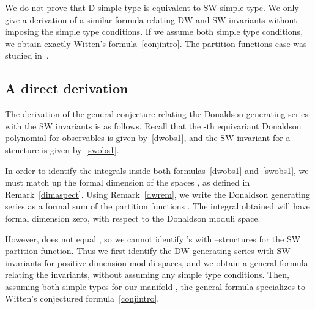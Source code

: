 \documentclass[a4paper,12pt,reqno,sumlimits]{amsart}
\theoremstyle{plain}
\theoremstyle{definition}
\providecommand{\1}{{\bf 1}}
\providecommand{\calA}{{\mathcal A}}
\providecommand{\calG}{{\mathcal G}}
\providecommand{\calO}{{\mathcal O}}
\providecommand{\spinc}{\myHighlight{$\text{spin}^c$}\coordHE{}}
\numberwithin{equation}{section}
\begin{document}
We do not prove that D-simple type is equivalent to SW-simple type. We only
give a derivation of a similar formula relating DW and SW invariants without
imposing the simple type conditions. If we assume both simple type
conditions, we obtain exactly Witten's formula~\eqref{conjintro}.  The
partition functions case was studied in~\cite{vajiac}.


\subsection{A direct derivation}

The derivation of the general conjecture relating the Donaldson generating
series with the SW invariants is as follows.  Recall that the \coordHE{}-th
equivariant Donaldson polynomial for observables \myHighlight{$\calO=\Sigma^a\wedge\nu^b$}\coordHE{}
is given by~\eqref{dwobs1}, and the SW invariant for a \spinc--structure \coordHE{}
is given by~\eqref{swobs1}. 

In order to identify the integrals inside both formulas~\eqref{dwobs1}
and~\eqref{swobs1}, we must match up the formal dimension of the spaces
\myHighlight{$\calA_{l}/\calG_{l}$}\coordHE{}, as defined in Remark~\ref{dimaspect}.  Using
Remark~\ref{dwrem}, we write the Donaldson generating series as a formal sum
of the partition functions \coordHE{}. The integral obtained will have formal
dimension zero, with respect to the Donaldson moduli space.  

However, \coordHE{} does not equal \myHighlight{$2\chi+3\sigma$}\coordHE{}, so we cannot identify
\coordHE{}'s with \spinc--structures for the SW partition function. Thus we first
identify the DW generating series with SW invariants for positive dimension
moduli spaces, and we obtain a general formula relating the invariants,
without assuming any simple type conditions.  Then, assuming both simple
types for our manifold \coordHE{}, the general formula specializes to Witten's
conjectured formula~\eqref{conjintro}.
\end{document}
